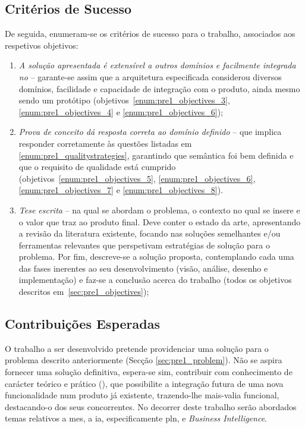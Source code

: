 \subsection{Critérios de Sucesso}

De seguida, enumeram-se os critérios de sucesso para o trabalho, associados aos respetivos objetivos:

\begin{enumerate}
    \item
    {
        \textit{A solução apresentada é extensível a outros domínios e facilmente integrada no {\productname}} -- garante-se assim que a arquitetura especificada considerou diversos domínios, facilidade e capacidade de integração com o produto, ainda mesmo sendo um protótipo (objetivos~\ref{enum:pre1_objectives_3}, \ref{enum:pre1_objectives_4} e \ref{enum:pre1_objectives_6});
    }
    \item
    {
        \textit{Prova de conceito dá resposta correta ao domínio definido} -- que implica responder corretamente às questões listadas em \ref{enum:pre1_qualitystrategies}, garantindo que semântica foi bem definida e que o requisito de qualidade está cumprido (objetivos~\ref{enum:pre1_objectives_5}, \ref{enum:pre1_objectives_6}, \ref{enum:pre1_objectives_7} e \ref{enum:pre1_objectives_8}).
    }
    \item 
    {
        \textit{Tese escrita} -- na qual se abordam o problema, o contexto no qual se insere e o valor que traz ao produto final. Deve conter o estado da arte, apresentando a revisão da literatura existente, focando nas soluções semelhantes e/ou ferramentas relevantes que perspetivam estratégias de solução para o problema. Por fim, descreve-se a solução proposta, contemplando cada uma das fases inerentes ao seu desenvolvimento (visão, análise, desenho e implementação) e faz-se a conclusão acerca do trabalho (todos os objetivos descritos em~\ref{sec:pre1_objectives});
    }
\end{enumerate}

\subsection{Contribuições Esperadas}

O trabalho a ser desenvolvido pretende providenciar uma solução para o problema descrito anteriormente (Secção \ref{sec:pre1_problem}). Não se aspira fornecer uma solução definitiva, espera-se sim, contribuir com conhecimento de carácter teórico e prático (), que possibilite a integração futura de uma nova funcionalidade num produto já existente, trazendo-lhe mais-valia funcional, destacando-o dos seus concorrentes. No decorrer deste trabalho serão abordados temas relativos a \gls{mes}, a \gls{ia}, especificamente \gls{pln}, e \textit{Business Intelligence}.

